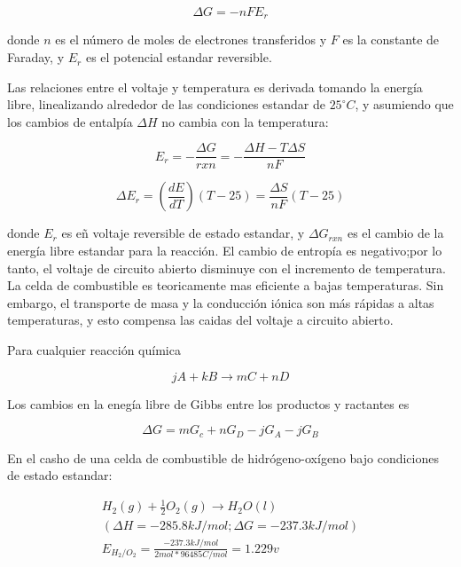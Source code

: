 \documentclass[12pt]{book}
\theoremstyle{definition}
\theoremstyle{remark}
\theoremstyle{plain}
\begin{document}
\begin{equation}
 \label{equ339}
\Delta G = - n F E_r
\end{equation}

donde $n$ es el número de moles de electrones transferidos y $F$ es la constante
de Faraday, y $E_r$ es el potencial estandar reversible.

Las relaciones entre el voltaje y temperatura es derivada tomando la energía libre,
linealizando alrededor de las condiciones estandar de $25^{\circ} C$, y asumiendo que los
cambios de entalpía $\Delta H$ no cambia con la temperatura:

\begin{equation}
 \label{equ340}
E_r = - \frac{\Delta G}{rxn}= - \frac{\Delta H - T \Delta S}{n F}
\end{equation}

\begin{equation}
 \label{equ341}
\Delta E_r = \left( \frac{d E}{d T} \right) (T-25) = \frac{\Delta S}{n F}(T-25)
\end{equation}

donde $E_r$ es eñ voltaje reversible de estado estandar, y $\Delta G_{rxn}$ es el cambio
de la energía libre estandar para la reacción. El cambio de entropía es negativo;por lo 
tanto, el voltaje de circuito abierto disminuye con el incremento de temperatura. La
celda de combustible es teoricamente mas eficiente a bajas temperaturas. Sin embargo,
el transporte de masa y la conducción iónica son más rápidas a altas temperaturas, y
esto compensa las caidas del voltaje a circuito abierto.

Para cualquier reacción química

\begin{equation}
 \label{equ342}
j A + kB \rightarrow mC + nD
\end{equation}

Los cambios en la enegía libre de Gibbs entre los productos y ractantes es

\begin{equation}
 \label{equ343}
\Delta G = m G_c + n G_D - j G_A- j G_B
\end{equation}

En el casho de una celda de combustible de hidrógeno-oxígeno bajo condiciones de estado
estandar:

\begin{equation*}
    \begin{aligned}
      H_2 (g) + \frac{1}{2}O_2(g) \rightarrow H_2O(l)\\
      (\Delta H = -285.8 kJ/mol; \Delta G = -237.3 kJ/mol) \\
      E_{H_2/O_2}= \frac{-237.3 kJ/mol}{2 mol*96485 C/mol}=1.229 v
    \end{aligned}
\end{equation*}
\end{document}
